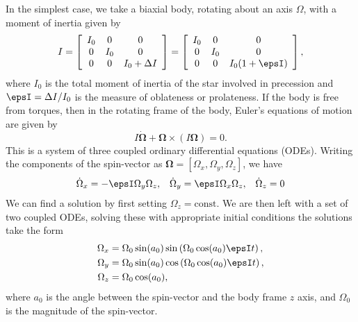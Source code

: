 In the simplest case, we take a biaxial body,
rotating about an axis $\Omega$, with a moment of inertia given by
\begin{equation}
    I = \left[\begin{array}{ccc}
            I_{0} & 0 & 0 \\
            0 & I_{0} & 0 \\
            0 & 0 & I_{0} + \Delta I
            \end{array}\right]
      = \left[\begin{array}{ccc}
            I_{0} & 0 & 0 \\
            0 & I_{0} & 0 \\
            0 & 0 & I_{0}(1 + \epsI)
            \end{array}\right],
\label{eqn: MOI}
\end{equation}
where $I_0$ is the total moment of inertia of the star involved in precession
and $\epsI = \Delta I/I_0$ is the measure of oblateness or prolateness. If the
body is free from torques, then in the rotating frame of the body, Euler's
equations of motion \citep{Landau1969} are given by
\begin{equation}
    I\dot{\bm{\Omega}} + \bm{\Omega} \times \left(I\bm{\Omega}\right)=0.
\end{equation}
This is a system of three coupled ordinary differential equations (ODEs).
Writing the components of the
spin-vector as $\bm{\Omega} = [\Omega_{x}, \Omega_{y}, \Omega_{z}]$, we have
\begin{align}
\dot{\Omega}_x = -\epsI \Omega_y\Omega_z, &&
\dot{\Omega}_y = \epsI \Omega_x \Omega_z, &&
\dot{\Omega}_z = 0
\end{align}
We can find a solution by first setting $\Omega_{z}=\mathrm{const}$.
We are then left with a set of
two coupled ODEs, solving these with appropriate initial conditions
the solutions take the form
\begin{align}
    \Omega_{x} & = \Omega_{0}\sin(a_0)\sin\left(\Omega_{0}\cos(a_0)\epsI t\right),
\label{eqn: free precession x} \\
    \Omega_{y} & = \Omega_{0}\sin(a_0)\cos\left(\Omega_{0}\cos(a_0)\epsI t\right),
\label{eqn: free precession y} \\
    \Omega_{z} & = \Omega_0 \cos(a_0),
\label{eqn: free precession z}
\end{align}
where $a_0$ is the angle between the spin-vector and the body frame $z$ axis, and
$\Omega_0$ is the magnitude of the spin-vector.

